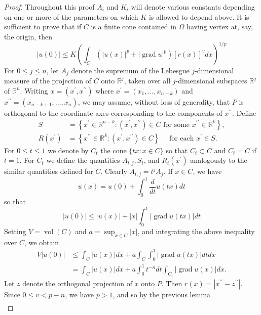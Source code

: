 \begin{proof}
  Throughout this proof $A_i$ and $K_i$ will denote various constants depending on one or more of the parameters on which $K$ is allowed to depend above. It is
  sufficient to prove that if $C$ is a finite cone contained in $\Omega$ having vertex at, say, the origin, then
  \[
  |u(0)| \leq K\left(\int_C\left(|u(x)|^p+|\operatorname{grad} u|^p\right)[r(x)]^v d x\right)^{1 / p}
  \]
  For $0 \leq j \leq n$, let $A_j$ denote the supremum of the Lebesgue $j$-dimensional measure of the projection of $C$ onto $\mathbb{R}^j$, taken over all $j$-dimensional subspaces $\mathbb{R}^j$ of $\mathbb{R}^n$. Writing $x=\left(x^{\prime}, x^{\prime \prime}\right)$ where $x^{\prime}=\left(x_1, \ldots, x_{n-k}\right)$ and $x^{\prime \prime}=\left(x_{n-k+1}, \ldots, x_n\right)$, we may assume, without loss of generality, that $P$ is orthogonal to the coordinate axes corresponding to the components of $x^{\prime \prime}$. Define
  \[
  \begin{aligned}
  S & =\left\{x^{\prime} \in \mathbb{R}^{n-k}:\left(x^{\prime}, x^{\prime \prime}\right) \in C \text { for some } x^{\prime \prime} \in \mathbb{R}^k\right\}, \\
  R\left(x^{\prime}\right) & =\left\{x^{\prime \prime} \in \mathbb{R}^k:\left(x^{\prime}, x^{\prime \prime}\right) \in C\right\} \quad \text { for each } x^{\prime} \in S .
  \end{aligned}
  \]
  For $0 \leq t \leq 1$ we denote by $C_t$ the cone $\{t x: x \in C\}$ so that $C_t \subset C$ and $C_t=C$ if $t=1$. For $C_t$ we define the quantities $A_{t, j}, S_t$, and $R_t\left(x^{\prime}\right)$ analogously to the similar quantities defined for $C$. Clearly $A_{t, j}=t^j A_j$. If $x \in C$, we have
  \[
  u(x)=u(0)+\int_0^1 \frac{d}{d t} u(t x) d t
  \]
  so that
  \[
  |u(0)| \leq|u(x)|+|x| \int_0^1|\operatorname{grad} u(t x)| d t
  \]
  Setting $V=\operatorname{vol}(C)$ and $a=\sup _{x \in C}|x|$, and integrating the above inequality over $C$, we obtain
  \[
  \begin{aligned}
  V|u(0)| & \leq \int_C|u(x)| d x+a \int_C \int_0^1|\operatorname{grad} u(t x)| d t d x \\
  & =\int_C|u(x)| d x+a \int_0^1 t^{-n} d t \int_{C_t}|\operatorname{grad} u(x)| d x .
  \end{aligned}
  \]
  Let $z$ denote the orthogonal projection of $x$ onto $P$. Then $r(x)=\left|x^{\prime \prime}-z^{\prime \prime}\right|$. Since $0 \leq v<p-n$, we have $p>1$, and so by the previous lemma
  \[
  \begin{aligned}

\end{aligned}\]
\end{proof}
